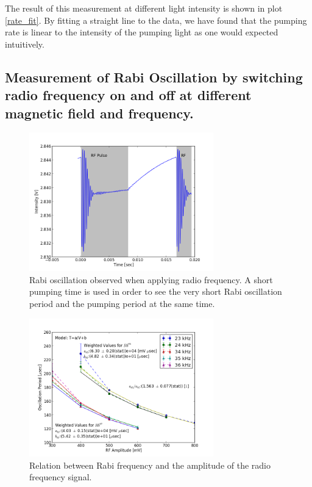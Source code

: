 \documentclass[aps,twocolumn,secnumarabic,balancelastpage,amsmath,amssymb,nofootinbib]{revtex4}
\begin{document}
The result of this measurement at different light intensity is shown in plot \ref{rate_fit}. By fitting a straight line to the data, we have found that the pumping rate is linear to the intensity of the pumping light as one would expected intuitively.

\subsection{Measurement of Rabi Oscillation by switching radio frequency on and off at different magnetic field and frequency.}
\begin{figure}
  \includegraphics[width=8cm]{../analysis/graphics/rabi_overview.png}
  \caption{Rabi oscillation observed when applying radio frequency. A short pumping time is used in order to see the very short Rabi oscillation period and the pumping period at the same time.}
  \label{rabi_overview}
\end{figure}
\begin{figure}
  \includegraphics[width=8cm]{../analysis/graphics/rabi_fit.png}
  \caption{Relation between Rabi frequency and the amplitude of the radio frequency signal.}
  \label{rabi_fit}
\end{figure}
\end{document}
